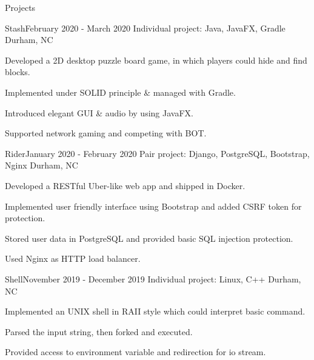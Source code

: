 \documentclass{resume} %
\begin{document}
\begin{rSection}{Projects}
    \begin{rSubsection}{Stash}{February 2020 - March 2020}
        {Individual project: Java, JavaFX, Gradle}
        {Durham, NC}
        \item Developed a 2D desktop puzzle board game, in which players could hide and find blocks. 
        \item Implemented under SOLID principle \& managed with Gradle.
        \item Introduced elegant GUI \& audio by using JavaFX.
        \item Supported network gaming and competing with BOT. 
        \end{rSubsection}

    \begin{rSubsection}{Rider}{January 2020 - February 2020}
        {Pair project: Django, PostgreSQL, Bootstrap, Nginx}
        {Durham, NC}
        \item Developed a RESTful Uber-like web app and shipped in Docker.
        \item Implemented user friendly interface using Bootstrap and added CSRF token for protection.
        \item Stored user data in PostgreSQL and provided basic SQL injection protection.
        \item Used Nginx as HTTP load balancer.
        \end{rSubsection}

    \begin{rSubsection}{Shell}{November 2019 - December 2019}
    {Individual project: Linux, C++}
    {Durham, NC}
    \item Implemented an UNIX shell in RAII style which could interpret basic command.
    \item Parsed the input string, then forked and executed.
    \item Provided access to environment variable and redirection for io stream.
    \end{rSubsection}




\end{rSection}


\end{document}
